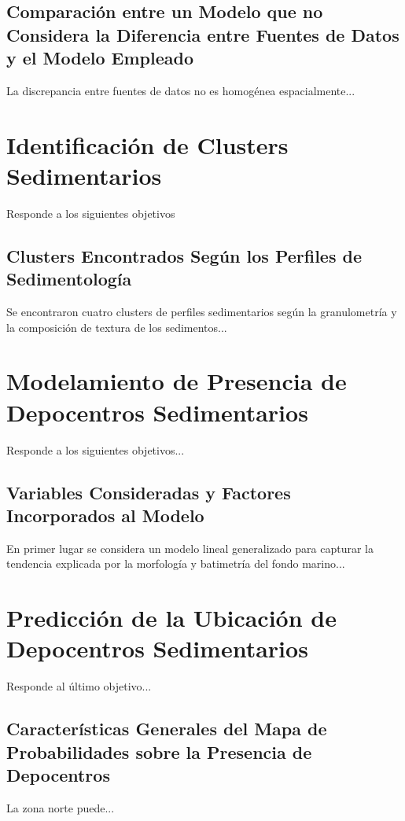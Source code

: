\subsection{Comparación entre un Modelo que no Considera la Diferencia entre Fuentes de Datos y el Modelo Empleado}

La discrepancia entre fuentes de datos no es homogénea espacialmente...


\section{Identificación de Clusters Sedimentarios}

Responde a los siguientes objetivos

\subsection{Clusters Encontrados Según los Perfiles de Sedimentología}

Se encontraron cuatro clusters de perfiles sedimentarios según la granulometría y la composición de textura de los sedimentos...

\section{Modelamiento de Presencia de Depocentros Sedimentarios}

Responde a los siguientes objetivos...

\subsection{Variables Consideradas y Factores Incorporados al Modelo}

En primer lugar se considera un modelo lineal generalizado para capturar la tendencia explicada por la morfología y batimetría del fondo marino...

\section{Predicción de la Ubicación de Depocentros Sedimentarios}

Responde al último objetivo...

\subsection{Características Generales del Mapa de Probabilidades sobre la Presencia de Depocentros}

La zona norte puede...
